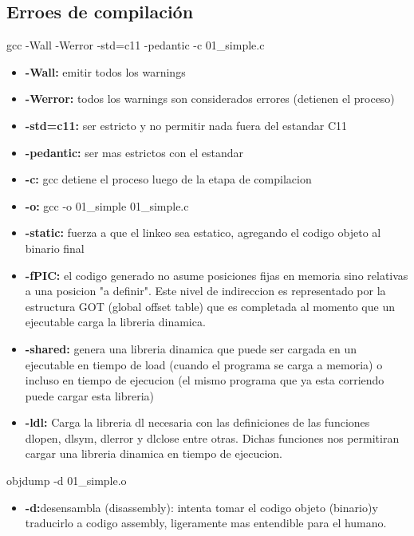 \documentclass[../main.tex]{subfiles}
\begin{document}
    \subsection{Erroes de compilación}
        gcc -Wall -Werror -std=c11 -pedantic -c  01\_simple.c
        \begin{itemize}
            \item \textbf{-Wall:} emitir todos los warnings
            \item \textbf{-Werror:} todos los warnings son considerados errores (detienen el proceso)
            \item \textbf{-std=c11:} ser estricto y no permitir nada fuera del estandar C11
            \item \textbf{-pedantic:} ser mas estrictos con el estandar
            \item \textbf{-c:} gcc detiene el proceso luego de la etapa de compilacion
            \item \textbf{-o:} gcc -o 01\_simple 01\_simple.c
            \item \textbf{-static:} fuerza a que el linkeo sea estatico, agregando el codigo objeto al binario final
            \item \textbf{-fPIC:} el codigo generado no asume posiciones fijas en memoria sino relativas a una posicion "a definir". Este nivel de indireccion es representado por la estructura GOT (global offset table) que es completada al momento que un ejecutable carga la libreria dinamica.
            \item \textbf{-shared:} genera una libreria dinamica que puede ser cargada en un ejecutable en tiempo de load (cuando el programa se carga a memoria) o incluso en tiempo de ejecucion (el mismo programa que ya esta corriendo puede cargar esta libreria)
            \item \textbf{-ldl:} Carga la libreria dl necesaria con las definiciones de las funciones dlopen, dlsym, dlerror y dlclose entre otras. Dichas funciones nos permitiran cargar una libreria dinamica en tiempo de ejecucion.
            
        \end{itemize}
        
        objdump -d 01\_simple.o
        \begin{itemize}
            \item \textbf{-d:}desensambla (disassembly): intenta tomar el codigo objeto (binario)y traducirlo a codigo assembly, ligeramente mas entendible para el humano.
        \end{itemize}
\end{document}
